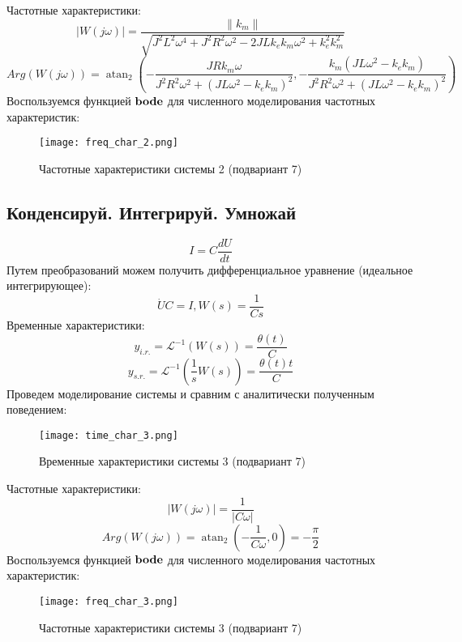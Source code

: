Частотные характеристики:
\begin{equation*}
    |W(j\omega)| = \frac{\|{k_{m}}\|}{\sqrt{J^{2} L^{2} \omega^{4} + J^{2} R^{2} \omega^{2} - 2 J L k_{e} k_{m} \omega^{2} + k_{e}^{2} k_{m}^{2}}}
\end{equation*}
\begin{equation*}
    Arg(W(j\omega)) = \operatorname{atan}_{2}{(- \frac{J R k_{m} \omega}{J^{2} R^{2} \omega^{2} + (J L \omega^{2} - k_{e} k_{m})^{2}},- \frac{k_{m} (J L \omega^{2} - k_{e} k_{m})}{J^{2} R^{2} \omega^{2} + (J L \omega^{2} - k_{e} k_{m})^{2}} )}
\end{equation*}
Воспользуемся функцией $\bold{bode}$ для численного моделирования частотных характеристик:
\begin{figure}[h]
    \centering
    \texttt{[image: freq\_char\_2.png]}
    \caption{\label{fig:The-caption-1}Частотные характеристики системы 2 (подвариант 7)}
\end{figure}
\pagebreak

\subsection*{Конденсируй. Интегрируй. Умножай}
\begin{equation}
    I = C\frac{dU}{dt}
\end{equation}
Путем преобразований можем получить дифференциальное уравнение (идеальное интегрирующее):
\begin{equation*}
    \dot{U}C = I, W(s)=\frac{1}{Cs}
\end{equation*}
Временные характеристики:
\begin{equation*}
    y_{i.r.}=\mathcal{L}^{-1}(W(s)) = \frac{\theta(t)}{C}
\end{equation*}
\begin{equation*}
    y_{s.r.}=\mathcal{L}^{-1}(\frac{1}{s}W(s)) = \frac{\theta(t)t}{C}
\end{equation*}
Проведем моделирование системы и сравним с аналитически полученным поведением:
\begin{figure}[h]
    \centering
    \texttt{[image: time\_char\_3.png]}
    \caption{\label{fig:The-caption-1}Временные характеристики системы 3 (подвариант 7)}
\end{figure}

Частотные характеристики:
\begin{equation*}
    |W(j\omega)| = \frac{1}{|C\omega|}
\end{equation*}
\begin{equation*}
    Arg(W(j\omega)) = \operatorname{atan}_{2}{(-\frac{1}{C\omega},0)}=-\frac{\pi}{2}
\end{equation*}
Воспользуемся функцией $\bold{bode}$ для численного моделирования частотных характеристик:
\begin{figure}[h]
    \centering
    \texttt{[image: freq\_char\_3.png]}
    \caption{\label{fig:The-caption-1}Частотные характеристики системы 3 (подвариант 7)}
\end{figure}
\pagebreak